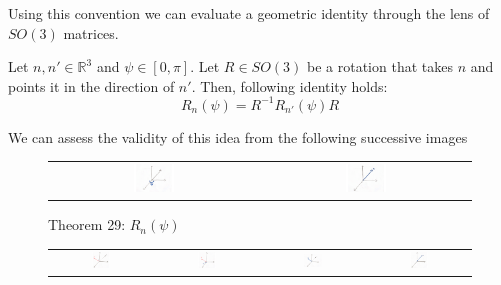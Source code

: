 \documentclass[compress,aspectratio=169,10pt,usenames,dvipsnames]{beamer}
\newcommand{\R}{\mathbb{R}}
\begin{document}
%
%
\begin{frame}
\vfill
Using this convention we can evaluate a geometric identity through the lens of $SO(3)$ matrices.
\vfill
\begin{theorem}
	Let $n, n'\in\R^3$ and $\psi\in[0,\pi]$. Let $R\in SO(3)$ be a rotation that takes $n$ and points it in the direction of $n'$. Then, following identity holds:
$$R_{n}(\psi) = R^{-1}R_{n'}(\psi)R$$
\end{theorem}
\vfill
We can assess the validity of this idea from the following successive images
\vfill
\end{frame}
%

\begin{frame}
\vfill
\begin{figure}[H]
	\centering
	\begin{tabular}{cc}
		\includegraphics[width=0.2\textwidth]{Rnpsi1.png}
&
		\includegraphics[width=0.2\textwidth]{Rnpsi2.png}
	\end{tabular}
	\caption{Theorem 29: $R_n(\psi)$}
\vfill
\end{figure}
\vfill

\begin{figure}[H]
	\centering

	\begin{tabular}{cccc}
		\includegraphics[width=0.2\textwidth]{RRnR1.png}
		&
		\includegraphics[width=0.2\textwidth]{RRnR2.png}
		&
		\includegraphics[width=0.2\textwidth]{RRnR3.png}
		&
		\includegraphics[width=0.2\textwidth]{RRnR4.png}


\end{tabular}
\end{figure}
\end{frame}
\end{document}
